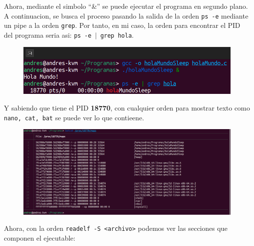 \documentclass{article}
\begin{document}
Ahora, mediante el simbolo ``\&'' se puede ejecutar el programa en segundo plano. A continuacion, se busca el proceso pasando la salida de la orden \verb|ps -e| mediante un pipe a la orden \verb|grep|. Por tanto, en mi caso, la orden para encontrar el PID del programa seria asi: \texttt{ps -e $\vert$ grep hola}.

\begin{figure}[H]
    \includegraphics[width=\textwidth]{imagenes/ps.png}
\end{figure}

Y sabiendo que tiene el PID \textbf{18770}, con cualquier orden para mostrar texto como \texttt{nano, cat, bat} se puede ver lo que contieene.

\begin{figure}[H]
    \includegraphics[width=\textwidth]{imagenes/procPID.png}
\end{figure}

Ahora, con la orden \verb|readelf -S <archivo>| podemos ver las secciones que componen el ejecutable:
\end{document}

